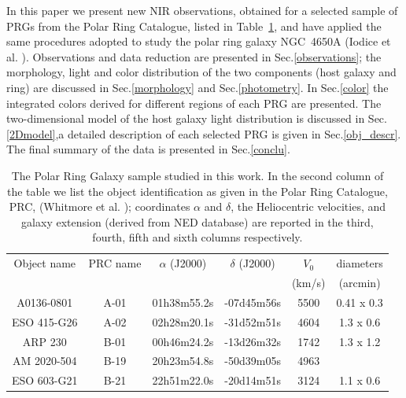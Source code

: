 \documentclass{aa}
\begin{document}
In this paper we present new NIR observations, obtained for a 
selected sample of PRGs from the Polar Ring Catalogue, listed in 
Table~\ref{prg}, and have applied the same procedures adopted
to study the polar ring galaxy NGC~4650A (Iodice et al. \cite{4650aI}).
Observations and data reduction are presented in Sec.\ref{observations}; 
the morphology, light and color distribution of the two components 
(host galaxy and ring) are discussed in Sec.\ref{morphology} and 
Sec.\ref{photometry}. In Sec.\ref{color} the integrated colors 
derived for different regions of each PRG are presented. 
The two-dimensional model of the host galaxy light distribution is discussed in 
Sec.\ref{2Dmodel},a detailed description of each selected
PRG is given in Sec.\ref{obj_descr}. The final summary of the data is 
presented in Sec.\ref{conclu}.                                               

\begin{table}
\centering
\caption[]{The Polar Ring Galaxy sample studied in this work. 
In the second column of the table we list the  object identification as
given in the Polar Ring Catalogue, PRC, (Whitmore et al. \cite{PRC}); 
coordinates $\alpha$ and $\delta$, the Heliocentric velocities, 
and galaxy extension (derived from NED database) are reported in the third, fourth, 
fifth and sixth columns respectively.}
\label{prg}
\begin{tabular}{cccccc}
\hline\hline
Object name & PRC name & $\alpha$ (J2000) & $\delta$ (J2000) & $V_{0}$ & diameters\\
  &  &  &  & (km/s) & (arcmin)\\
\hline
A0136-0801 & A-01 & 01h38m55.2s & -07d45m56s & 5500 & 0.41 x 0.3\\
ESO 415-G26 & A-02 & 02h28m20.1s & -31d52m51s & 4604 & 1.3 x 0.6 \\
ARP 230 & B-01 & 00h46m24.2s & -13d26m32s & 1742 & 1.3 x 1.2\\
AM 2020-504 & B-19 & 20h23m54.8s & -50d39m05s & 4963 &   \\
ESO 603-G21 & B-21 & 22h51m22.0s & -20d14m51s & 3124 & 1.1 x 0.6 \\
\hline
\end{tabular}
\end{table}      
\end{document}
